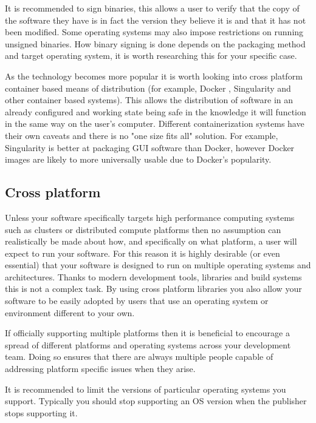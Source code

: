 \documentclass[jnr]{iosart2x}
\begin{document}
It is recommended to sign binaries, this allows a user to verify that the copy of the software they have is in fact the version they believe it is and that it has not been modified.
Some operating systems may also impose restrictions on running unsigned binaries.
How binary signing is done depends on the packaging method and target operating system, it is worth researching this for your specific case.

As the technology becomes more popular it is worth looking into cross platform container based means of distribution (for example, Docker \cite{Docker}, Singularity \cite{Kurtzer_2017} and other container based systems).
This allows the distribution of software in an already configured and working state being safe in the knowledge it will function in the same way on the user's computer.
Different containerization systems have their own caveats and there is no "one size fits all" solution.
For example, Singularity is better at packaging GUI software than Docker, however Docker images are likely to more universally usable due to Docker's popularity.

\subsection{Cross platform}
\label{Cross platform}

Unless your software specifically targets high performance computing systems such as clusters or distributed compute platforms then no assumption can realistically be made about how, and specifically on what platform, a user will expect to run your software.
For this reason it is highly desirable (or even essential) that your software is designed to run on multiple operating systems and architectures.
Thanks to modern development tools, libraries and build systems this is not a complex task.
By using cross platform libraries you also allow your software to be easily adopted by users that use an operating system or environment different to your own.

If officially supporting multiple platforms then it is beneficial to encourage a spread of different platforms and operating systems across your development team.
Doing so ensures that there are always multiple people capable of addressing platform specific issues when they arise.

It is recommended to limit the versions of particular operating systems you support.
Typically you should stop supporting an OS version when the publisher stops supporting it.
\end{document}
